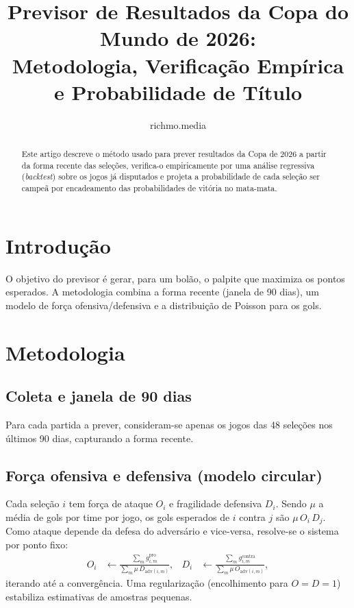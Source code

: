 \documentclass[11pt,a4paper]{article}
\title{Previsor de Resultados da Copa do Mundo de 2026:\\
Metodologia, Verifica\c{c}\~ao Emp\'irica e Probabilidade de T\'itulo}
\author{richmo.media}
\date{\dataAnalise}
\begin{document}
\maketitle

\begin{abstract}
Este artigo descreve o m\'etodo usado para prever resultados da Copa de 2026 a
partir da forma recente das sele\c{c}\~oes, verifica-o empiricamente por uma
an\'alise regressiva (\emph{backtest}) sobre os jogos j\'a disputados e projeta
a probabilidade de cada sele\c{c}\~ao ser campe\~a por encadeamento das
probabilidades de vit\'oria no mata-mata.
\end{abstract}

\section{Introdu\c{c}\~ao}
O objetivo do previsor \'e gerar, para um bol\~ao, o palpite que maximiza os
pontos esperados. A metodologia combina a forma recente (janela de 90 dias),
um modelo de for\c{c}a ofensiva/defensiva e a distribui\c{c}\~ao de Poisson para
os gols.

\section{Metodologia}
\subsection{Coleta e janela de 90 dias}
Para cada partida a prever, consideram-se apenas os jogos das 48 sele\c{c}\~oes
nos \'ultimos 90 dias, capturando a forma recente.

\subsection{For\c{c}a ofensiva e defensiva (modelo circular)}
Cada sele\c{c}\~ao $i$ tem for\c{c}a de ataque $O_i$ e fragilidade defensiva
$D_i$. Sendo $\mu$ a m\'edia de gols por time por jogo, os gols esperados de $i$
contra $j$ s\~ao $\mu\,O_i\,D_j$. Como ataque depende da defesa do advers\'ario
e vice-versa, resolve-se o sistema por ponto fixo:
\begin{align}
O_i &\leftarrow \frac{\sum_{m} g^{\text{pro}}_{i,m}}
                     {\sum_{m} \mu\,D_{\text{adv}(i,m)}}, &
D_i &\leftarrow \frac{\sum_{m} g^{\text{contra}}_{i,m}}
                     {\sum_{m} \mu\,O_{\text{adv}(i,m)}},
\end{align}
iterando at\'e a converg\^encia. Uma regulariza\c{c}\~ao (encolhimento para
$O=D=1$) estabiliza estimativas de amostras pequenas.
\end{document}
